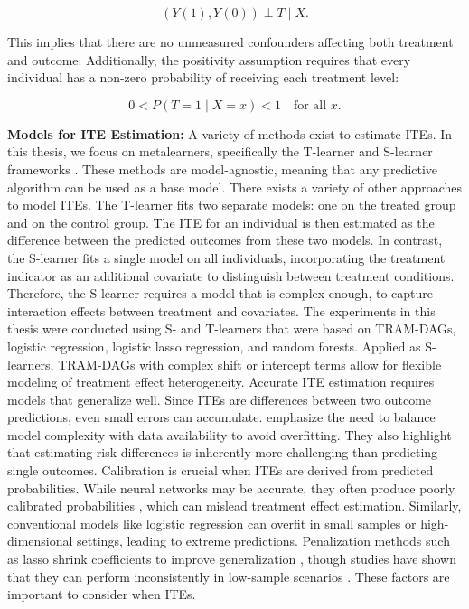 \begin{equation}
(Y(1), Y(0)) \perp T \mid X.
\end{equation}

This implies that there are no unmeasured confounders affecting both treatment and outcome. Additionally, the positivity assumption requires that every individual has a non-zero probability of receiving each treatment level:

\begin{equation}
0 < P(T = 1 \mid X = x) < 1 \quad \text{for all } x.
\end{equation}


\medskip




\textbf{Models for ITE Estimation:} \label{sec:ite_models} A variety of methods exist to estimate ITEs. In this thesis, we focus on metalearners, specifically the T-learner and S-learner frameworks \citep{kunzel2019}. These methods are model-agnostic, meaning that any predictive algorithm can be used as a base model. There exists a variety of other approaches to model ITEs. The T-learner fits two separate models: one on the treated group and on the control group. The ITE for an individual is then estimated as the difference between the predicted outcomes from these two models. In contrast, the S-learner fits a single model on all individuals, incorporating the treatment indicator as an additional covariate to distinguish between treatment conditions. Therefore, the S-learner requires a model that is complex enough, to capture interaction effects between treatment and covariates. The experiments in this thesis were conducted using S- and T-learners that were based on TRAM-DAGs, logistic regression, logistic lasso regression, and random forests. Applied as S-learners, TRAM-DAGs with complex shift or intercept terms allow for flexible modeling of treatment effect heterogeneity. 
Accurate ITE estimation requires models that generalize well. Since ITEs are differences between two outcome predictions, even small errors can accumulate. \citet{hoogland2021} emphasize the need to balance model complexity with data availability to avoid overfitting. They also highlight that estimating risk differences is inherently more challenging than predicting single outcomes. Calibration is crucial when ITEs are derived from predicted probabilities. While neural networks may be accurate, they often produce poorly calibrated probabilities \citep{guo2017}, which can mislead treatment effect estimation. Similarly, conventional models like logistic regression can overfit in small samples or high-dimensional settings, leading to extreme predictions. Penalization methods such as lasso shrink coefficients to improve generalization \citep{riley2021}, though studies have shown that they can perform inconsistently in low-sample scenarios \citep{calster2020}. These factors are important to consider when ITEs.
